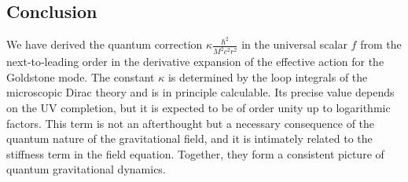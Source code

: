 \documentclass[11pt,a4paper]{article}
\begin{document}
\subsection{Conclusion}

We have derived the quantum correction \(\kappa \frac{\hbar^2}{M^2 c^2 r^2}\) in the universal scalar \(f\) from the next‑to‑leading order in the derivative expansion of the effective action for the Goldstone mode. The constant \(\kappa\) is determined by the loop integrals of the microscopic Dirac theory and is in principle calculable. Its precise value depends on the UV completion, but it is expected to be of order unity up to logarithmic factors. This term is not an afterthought but a necessary consequence of the quantum nature of the gravitational field, and it is intimately related to the stiffness term in the field equation. Together, they form a consistent picture of quantum gravitational dynamics.
\end{document}
